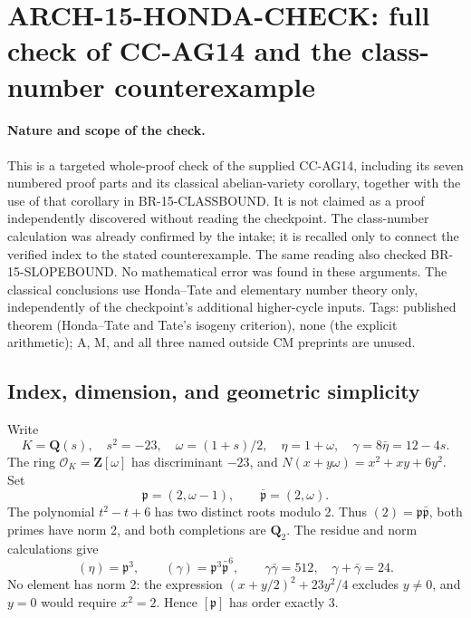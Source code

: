 \section{ARCH-15-HONDA-CHECK: full check of CC-AG14 and the class-number counterexample}
\label{arch15-honda-check}

\paragraph{Nature and scope of the check.}
This is a targeted whole-proof check of the supplied CC-AG14, including
its seven numbered proof parts and its classical abelian-variety
corollary, together with the use of that corollary in
BR-15-CLASSBOUND. It is not claimed as a proof independently discovered
without reading the checkpoint. The class-number calculation was
already confirmed by the intake; it is recalled only to connect the
verified index to the stated counterexample. The same reading also
checked BR-15-SLOPEBOUND. No mathematical error was found in these
arguments. The classical conclusions use Honda--Tate and elementary
number theory only, independently of the checkpoint's additional
higher-cycle inputs. Tags: published theorem (Honda--Tate and Tate's
isogeny criterion), none (the explicit arithmetic); A, M, and all three
named outside CM preprints are unused.

\subsection{Index, dimension, and geometric simplicity}

Write
\[
 K=\mathbf Q(s),\quad s^2=-23,\quad
 \omega=(1+s)/2,\quad \eta=1+\omega,
 \quad\gamma=8\bar\eta=12-4s.
\]
The ring \(\mathcal O_K=\mathbf Z[\omega]\) has discriminant \(-23\),
and \(N(x+y\omega)=x^2+xy+6y^2\). Set
\[
 \mathfrak p=(2,\omega-1),\qquad
 \bar{\mathfrak p}=(2,\omega).
\]
The polynomial \(t^2-t+6\) has two distinct roots modulo 2. Thus
\((2)=\mathfrak p\bar{\mathfrak p}\), both primes have norm 2, and
both completions are \(\mathbf Q_2\). The residue and norm calculations
give
\[
 (\eta)=\mathfrak p^3,\qquad
 (\gamma)=\mathfrak p^3\bar{\mathfrak p}^{6},\qquad
 \gamma\bar\gamma=512,
 \quad\gamma+\bar\gamma=24.
 \tag{ARCH-15.H1}
\]
No element has norm 2: the expression
\((x+y/2)^2+23y^2/4\) excludes \(y\ne0\), and \(y=0\) would require
\(x^2=2\). Hence \([\mathfrak p]\) has order exactly 3.

